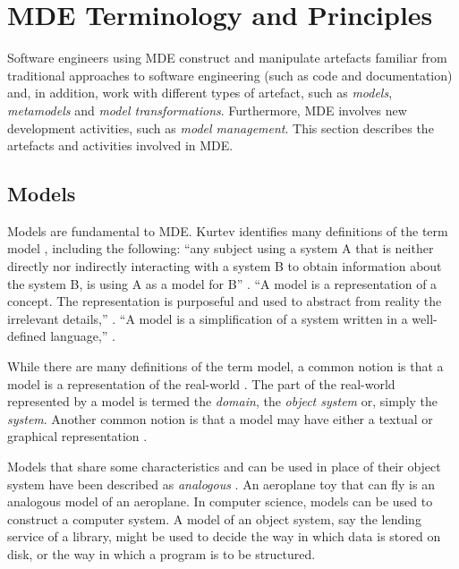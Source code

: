 
\section{MDE Terminology and Principles}
\label{sec:mde_terms}
Software engineers using MDE construct and manipulate artefacts familiar from traditional approaches to software engineering (such as code and documentation) and, in addition, work with different types of artefact, such as \emph{models}, \emph{metamodels} and \emph{model transformations}. Furthermore, MDE involves new development activities, such as \emph{model management}. This section describes the artefacts and activities involved in MDE.

\subsection{Models}
\label{subsec:models}
Models are fundamental to MDE. Kurtev \cc identifies many definitions of the term model \cite{kurtev04thesis}, including the following: ``any subject using a system A that is neither directly nor indirectly interacting with a system B to obtain information about the system B, is using A as a model for B'' \cite{apostel60models}. ``A model is a representation of a concept. The representation is purposeful and used to abstract from reality the irrelevant details,'' \cite{starfield90model}. ``A model is a simplification of a system written in a well-defined language,'' \cite{bezivin01definition}. 

While there are many definitions of the term model, a common notion is that a model is a representation of the real-world \cite[pg12]{kurtev04thesis}. The part of the real-world represented by a model is termed the \emph{domain}, the \emph{object system} or, simply the \emph{system}. Another \cc common notion is that a model may have either a textual or graphical representation \cite{kolovos06eol}.

Models \cc that share some characteristics and can be used in place of their object system have been described as \emph{analogous} \cite{ackoff62scientific}. An aeroplane toy that can fly is an analogous model of an aeroplane. In computer science, models can be used to construct a computer system. A model of an object system, say the lending service of a library, might be used to decide the way in which data is stored on disk, or the way in which a program is to be structured.


